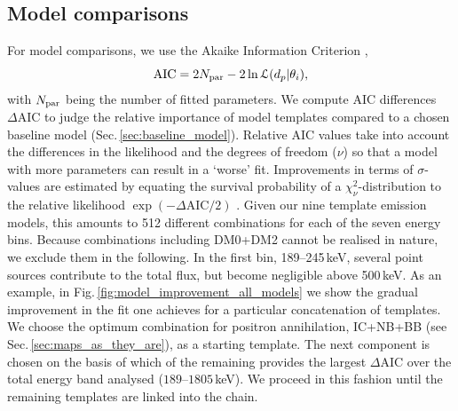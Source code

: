 \documentclass[doublespace,nopageskip]{VTthesis} %
\begin{document}
	\subsection{Model comparisons}\label{sec:model_comparisons}\label{sec:model_combinations}
	For model comparisons, we use the Akaike Information Criterion \citep[AIC;][]{Akaike1974_AIC,Burnham2004_AICBIC},
	\begin{equation}
		\mathrm{AIC} = 2 N_{\rm par} - 2 \ln\mathcal{L}(d_p|\theta_i)\mathrm{,}
		\label{eq:AICc}
	\end{equation}
	\noindent with $N_{\rm par}$ being the number of fitted parameters.
	We compute AIC differences $\Delta\mathrm{AIC}$ to judge the relative importance of model templates compared to a chosen baseline model (Sec.\,\ref{sec:baseline_model}).
	Relative AIC values take into account the differences in the likelihood and the degrees of freedom ($\nu$) so that a model with more parameters can result in a `worse' fit.
	Improvements in terms of $\sigma$-values are estimated by equating the survival probability of a $\chi^2_{\nu}$-distribution to the relative likelihood $\exp\left(-\Delta\mathrm{AIC}/2\right)$ \citep{Burnham2004_AICBIC}.
	Given our nine template emission models, this amounts to 512 different combinations for each of the seven energy bins.
	Because combinations including DM0+DM2 cannot be realised in nature, we exclude them in the following.
	In the first bin, 189--245\,keV, several point sources contribute to the total flux, but become negligible above 500\,keV.	
	As an example, in Fig.\,\ref{fig:model_improvement_all_models} we show the 
	gradual improvement in the fit one achieves for a particular concatenation of templates.
	We choose the optimum combination for positron annihilation, IC+NB+BB (see Sec.\,\ref{sec:maps_as_they_are}), as a starting template.
	The next component is chosen on the basis of which of the remaining provides the largest $\Delta\mathrm{AIC}$ over the total energy band analysed ($189$--$1805$\,keV).
	We proceed in this fashion until the remaining templates are linked into the chain.
\end{document}
